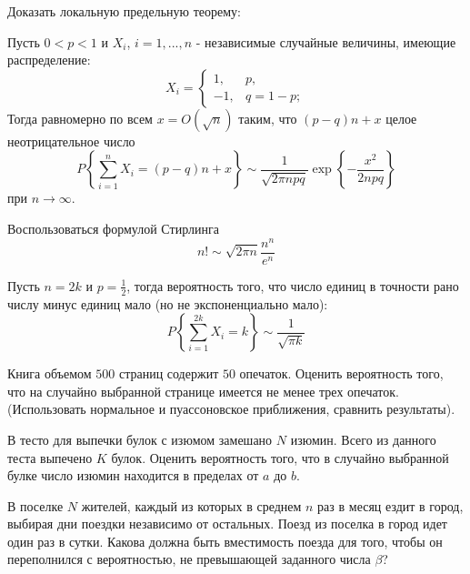 \begin{problem}

Доказать локальную предельную теорему:

\noindent Пусть $0<p<1$ и $X_{i} $, $i=1,...,n$ - независимые случайные величины, имеющие распределение:
\[X_{i} =\left\{\begin{array}{cc} {1,} & {p,} \\ {-1,} & {q=1-p;} \end{array}\right. \] 
Тогда равномерно по всем $x=O\left(\sqrt{n} \right)$ таким, что $(p-q)n+x$ целое неотрицательное число
\[P\left\{\sum _{i=1}^{n}X_{i} =(p-q)n+x \right\}\sim \frac{1}{\sqrt{2\pi npq} } \exp \left\{-\frac{x^{2} }{2npq} \right\}\] 
при $n\to \infty $. 

\begin{ordre}
Воспользоваться формулой Стирлинга
\[
n! \sim \sqrt{2 \pi n} \frac{n^n}{e^n} 
\]
\end{ordre}

\begin{remark}
Пусть $n=2k$ и $p=\frac{1}{2} $, тогда вероятность того, что число единиц в точности рано числу минус единиц мало (но не экспоненциально мало):
\[P\left\{\sum _{i=1}^{2k}X_{i} =k \right\}\sim \frac{1}{\sqrt{\pi k} } \] 
\end{remark}

\end{problem}


\begin{problem}
Книга объемом $500$ страниц содержит $50$ опечаток. Оценить вероятность того, что на случайно выбранной странице 
имеется не менее трех опечаток. (Использовать нормальное и пуассоновское приближения, сравнить результаты). 
\end{problem}

\begin{problem}
В тесто для выпечки булок с изюмом замешано $N$ изюмин. Всего из данного теста выпечено $K$ булок. Оценить вероятность того, 
что в случайно выбранной булке число изюмин находится в пределах от $a$ до $b$. 
\end{problem}

\begin{problem}
В поселке $N$ жителей, каждый из которых в среднем $n$ раз в месяц ездит в город, выбирая дни поездки независимо от остальных. 
Поезд из поселка в город идет один раз в сутки. Какова должна быть вместимость поезда для того, чтобы он переполнился с вероятностью, 
не превышающей заданного числа $\beta$? 
\end{problem}

